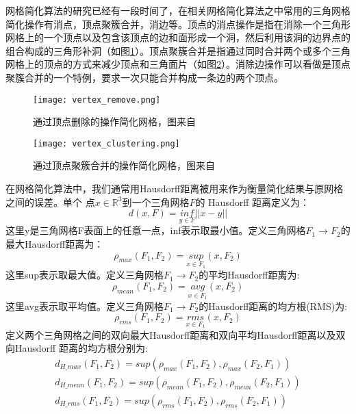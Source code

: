 网格简化算法的研究已经有一段时间了，在相关网格简化算法之中常用的三角网格简化操作有消点，顶点聚簇合并，消边等。顶点的消点操作是指在消除一个三角形网格上的一个顶点以及包含该顶点的边和面形成一个洞，然后利用该洞的边界点的组合构成的三角形补洞（如图\ref{fig:rm-vertex}）。顶点聚簇合并是指通过同时合并两个或多个三角网格上的顶点的方式来减少顶点和三角面片（如图\ref{fig:clu-vertex}）。消除边操作可以看做是顶点聚簇合并的一个特例，要求一次只能合并构成一条边的两个顶点。
\begin{figure}[htbp]
    \centering
    \texttt{[image: vertex\_remove.png]}
    \caption[顶点删除]{通过顶点删除的操作简化网格，图来自\cite{mesh-simp}}
    \label{fig:rm-vertex}
\end{figure}
\begin{figure}[htbp]
    \centering
    \texttt{[image: vertex\_clustering.png]}
    \caption[顶点聚簇合并]{通过顶点聚簇合并的操作简化网格，图来自\cite{mesh-simp}}
    \label{fig:clu-vertex}
\end{figure}
在网格简化算法中，我们通常用Hausdorff距离\cite{hausdorff-dis}被用来作为衡量简化结果与原网格之间的误差。单个
点$x\in\mathbb{R}^3$到一个三角网格$F$的 Hausdorff 距离定义为：
\begin{equation}
  d(x, F) = \underset{y\in F}{inf}||x-y||
  \label{eq:v2f-haus}
\end{equation}
这里y是三角网格F表面上的任意一点，inf表示取最小值。定义三角网格$F_1 \to F_2$的最大Hausdorff距离为：
\begin{equation}
  \rho_{max}(F_1,F_2)=\underset{x\in F_1}{sup}(x,F_2)
  \label{eq:f2f-max-haus}
\end{equation}
这里sup表示取最大值。定义三角网格$F_1 \to F_2$的平均Hausdorff距离为:
\begin{equation}
  \rho_{mean}(F_1,F_2)=\underset{x\in F_1}{avg}(x,F_2)
  \label{eq:f2f-mean-haus}
\end{equation}
这里avg表示取平均值。定义三角网格$F_1 \to F_2$的Hausdorff距离的均方根(RMS)为:
\begin{equation}
  \rho_{rms}(F_1,F_2)=\underset{x\in F_1}{rms}(x,F_2)
  \label{eq:f2f-rms-haus}
\end{equation}
定义两个三角网格之间的双向最大Hausdorff距离和双向平均Hausdorff距离以及双向Hausdorff 距离的均方根分别为:
\begin{equation}
  \begin{array}{l}
    d_{H\_max}(F_1,F_2)=sup(\rho_{max}(F_1,F_2), \rho_{max}(F_2,F_1))\\
    d_{H\_mean}(F_1,F_2)=sup(\rho_{mean}(F_1,F_2), \rho_{mean}(F_2,F_1))\\
    d_{H\_rms}(F_1,F_2)=sup(\rho_{rms}(F_1,F_2), \rho_{rms}(F_2,F_1))
  \end{array}
  \label{eq:ff-haus}
\end{equation}
